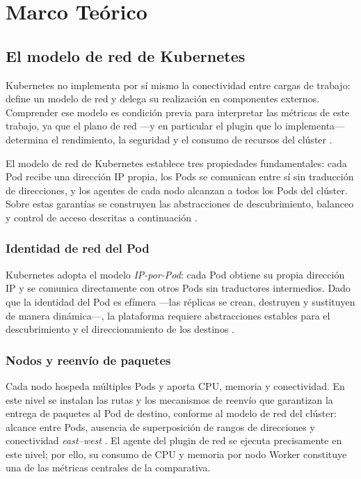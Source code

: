 \section{Marco Teórico}

\subsection{El modelo de red de Kubernetes}

Kubernetes no implementa por sí mismo la conectividad entre cargas de trabajo: define un modelo de red y delega su realización en componentes externos. Comprender ese modelo es condición previa para interpretar las métricas de este trabajo, ya que el plano de red ---y en particular el plugin que lo implementa--- determina el rendimiento, la seguridad y el consumo de recursos del clúster \cite{ref2}.

El modelo de red de Kubernetes establece tres propiedades fundamentales: cada Pod recibe una dirección IP propia, los Pods se comunican entre sí sin traducción de direcciones, y los agentes de cada nodo alcanzan a todos los Pods del clúster. Sobre estas garantías se construyen las abstracciones de descubrimiento, balanceo y control de acceso descritas a continuación \cite{ref2}.

\subsubsection{Identidad de red del Pod}

Kubernetes adopta el modelo \emph{IP-por-Pod}: cada Pod obtiene su propia dirección IP y se comunica directamente con otros Pods sin traductores intermedios. Dado que la identidad del Pod es efímera ---las réplicas se crean, destruyen y sustituyen de manera dinámica---, la plataforma requiere abstracciones estables para el descubrimiento y el direccionamiento de los destinos \cite{ref2}.

\subsubsection{Nodos y reenvío de paquetes}

Cada nodo hospeda múltiples Pods y aporta CPU, memoria y conectividad. En este nivel se instalan las rutas y los mecanismos de reenvío que garantizan la entrega de paquetes al Pod de destino, conforme al modelo de red del clúster: alcance entre Pods, ausencia de superposición de rangos de direcciones y conectividad \emph{east--west} \cite{ref2}. El agente del plugin de red se ejecuta precisamente en este nivel; por ello, su consumo de CPU y memoria por nodo Worker constituye una de las métricas centrales de la comparativa.

